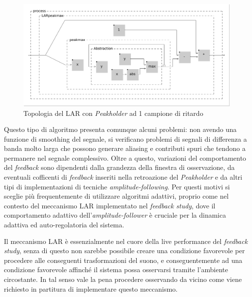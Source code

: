\begin{figure}[h!]
\begin{center}
    \includegraphics[width=14cm]{figures/LARpeakmax.pdf} 
    \caption{Topologia del LAR con \textit{Peakholder} ad 1 campione di ritardo} 
\end{center}
\vspace{0.5cm}
\end{figure} 

Questo tipo di algoritmo presenta comunque alcuni problemi: non avendo
una funzione di smoothing del segnale, si verificano problemi di segnali di differenza a banda
molto larga che possono generare aliasing e contributi spuri che tendono a permanere nel
segnale complessivo.
Oltre a questo, variazioni del comportamento del \emph{feedback} sono dipendenti dalla grandezza
della finestra di osservazione, da eventuali cofficenti di \emph{feedback} inseriti nella
retroazione del \textit{Peakholder} e da altri tipi di implementazioni di tecniche 
\textit{amplitude-following}. Per questi motivi si sceglie più frequentemente di utilizzare algoritmi
adattivi, proprio come nel contesto del meccanismo LAR implementato nel \emph{feedback study},
dove il comportamento adattivo dell'\textit{amplitude-follower} è cruciale
per la dinamica adattiva ed auto-regolatoria del sistema.

Il meccanismo LAR è essenzialmente nel cuore della live performance del \emph{feedback study},
senza di questo non sarebbe possibile creare una condizione favorevole per procedere alle 
conseguenti trasformazioni del suono, e conseguentemente ad una condizione favorevole affinché il 
sistema possa osservarsi tramite l'ambiente circostante. 
In tal senso vale la pena procedere osservando da vicino come viene richiesto in partitura 
di implementare questo meccanismo.


